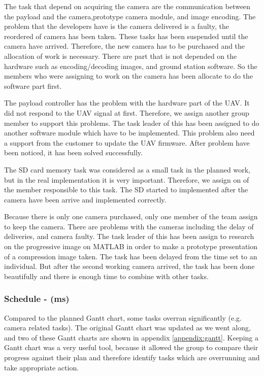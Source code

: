 The task that depend on acquiring the camera are the communication between the payload and the camera,prototype camera module, and image encoding. 
The problem that the developers have is the camera delivered is a faulty, the reordered of camera has been taken.
These tasks has been suspended until the camera have arrived.  
Therefore, the new camera has to be purchased and the allocation of work is necessary. 
There are part that is not depended on the hardware such as encoding/decoding images, and ground station software. 
So the members who were assigning to work on the camera has been allocate to do the software part first.

The payload controller has the problem with the hardware part of the UAV. 
It did not respond to the UAV signal at first. 
Therefore, we assign another group member to support this problems. 
The task leader of this has been assigned to do another software module which have to be implemented. 
This problem also need a support from the customer to update the UAV firmware. 
After problem have been noticed, it has been solved successfully. 

The SD card memory task was considered as a small task in the planned work, but in the real implementation it is very important. 
Therefore, we assign on of the member responsible to this task. 
The SD started to implemented after the camera have been arrive and implemented correctly. 

Because there is only one camera purchased, only one member of the team assign to keep the camera. 
There are problems with the cameras including the delay of deliveries, and camera faulty. 
The task leader of this has been assign to research on the progressive image on MATLAB in order to make a prototype presentation of a compression image taken. 
The task has been delayed from the time set to an individual. 
But after the second working camera arrived, the task has been done beautifully and there is enough time to combine with other tasks.

\subsubsection{Schedule - (ms)}
Compared to the planned Gantt chart, some tasks overran significantly (e.g. camera related tasks). The original Gantt chart was updated as we went along, and two of these Gantt charts are shown in appendix \ref{appendix:gantt}. Keeping a Gantt chart was a very useful tool,  because it allowed the group to compare their progress against their plan and therefore identify tasks which are overrunning and take appropriate action. 
